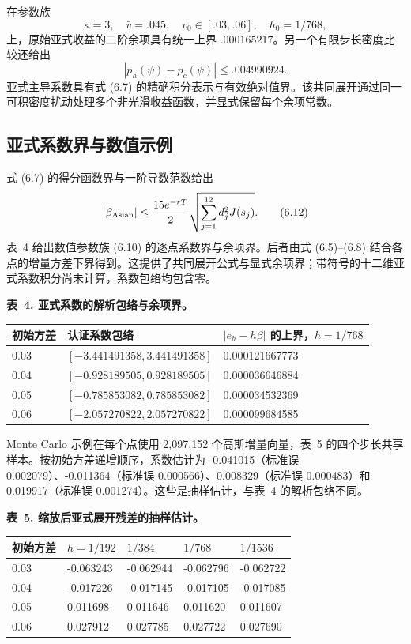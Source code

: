 在参数族
\[
\kappa=3,\quad\bar v=.045,\quad v_0\in[.03,.06],\quad h_0=1/768,
\tag{6.10}
\]
上，原始亚式收益的二阶余项具有统一上界
\(.000165217\)。另一个有限步长密度比较还给出
\[
|p_h(\psi)-p_c(\psi)|\le .004990924.
\tag{6.11}
\]
亚式主导系数具有式 (6.7) 的精确积分表示与有效绝对值界。该共同展开通过同一可积密度扰动处理多个非光滑收益函数，并显式保留每个余项常数。

\subsection{亚式系数界与数值示例}

式 (6.7) 的得分函数界与一阶导数范数给出
\[
|\beta_{\rm Asian}|
\le {15e^{-rT}\over2}\sqrt{\sum_{j=1}^{12}d_j^2J(s_j)}.
\tag{6.12}
\]
表~4 给出数值参数族 (6.10) 的逐点系数界与余项界。后者由式 (6.5)--(6.8) 结合各点的增量方差下界得到。这提供了共同展开公式与显式余项界；带符号的十二维亚式系数积分尚未计算，系数包络均包含零。

\noindent\textbf{表~4. 亚式系数的解析包络与余项界。}
\begin{center}
\begin{tabularx}{\textwidth}{@{}l X X@{}}
\toprule
初始方差 & 认证系数包络 & \(|e_h-h\beta|\) 的上界，\(h=1/768\) \\
\midrule
0.03 & \([-3.441491358,3.441491358]\) & 0.000121667773 \\
0.04 & \([-0.928189505,0.928189505]\) & 0.000036646884 \\
0.05 & \([-0.785853082,0.785853082]\) & 0.000034532369 \\
0.06 & \([-2.057270822,2.057270822]\) & 0.000099684585 \\
\bottomrule
\end{tabularx}
\end{center}

Monte Carlo 示例在每个点使用 2,097,152 个高斯增量向量，表~5 的四个步长共享样本。按初始方差递增顺序，系数估计为 -0.041015（标准误 0.002079）、-0.011364（标准误 0.000566）、0.008329（标准误 0.000483）和 0.019917（标准误 0.001274）。这些是抽样估计，与表~4 的解析包络不同。

\noindent\textbf{表~5. 缩放后亚式展开残差的抽样估计。}
\begin{center}
\begin{tabularx}{\textwidth}{@{}l X X X X@{}}
\toprule
初始方差 & \(h=1/192\) & \(1/384\) & \(1/768\) & \(1/1536\) \\
\midrule
0.03 & -0.063243 & -0.062944 & -0.062796 & -0.062722 \\
0.04 & -0.017226 & -0.017145 & -0.017105 & -0.017085 \\
0.05 & 0.011698 & 0.011646 & 0.011620 & 0.011607 \\
0.06 & 0.027912 & 0.027785 & 0.027722 & 0.027690 \\
\bottomrule
\end{tabularx}
\end{center}

